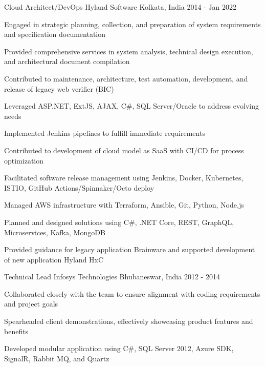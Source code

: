 \begin{cventries}
  \cventry
    {Cloud Architect/DevOps} %
    {Hyland Software} %
    {Kolkata, India} %
    {2014 - Jan 2022} %
    {
      \begin{cvitems} %
        \item {Engaged in strategic planning, collection, and preparation of system requirements and specification documentation}
        \item {Provided comprehensive services in system analysis, technical design execution, and architectural document compilation}
        \item {Contributed to maintenance, architecture, test automation, development, and release of legacy web verifier (BIC)}
        \item {Leveraged ASP.NET, ExtJS, AJAX, C\#, SQL Server/Oracle to address evolving needs}
        \item {Implemented Jenkins pipelines to fulfill immediate requirements}
        \item {Contributed to development of cloud model as SaaS with CI/CD for process optimization}
        \item {Facilitated software release management using Jenkins, Docker, Kubernetes, ISTIO, GitHub Actions/Spinnaker/Octo deploy}
        \item {Managed AWS infrastructure with Terraform, Ansible, Git, Python, Node.js}
        \item {Planned and designed solutions using C\#, .NET Core, REST, GraphQL, Microservices, Kafka, MongoDB}
        \item {Provided guidance for legacy application Brainware and supported development of new application Hyland HxC}\\
      \end{cvitems}
    }

  \cventry
    {Technical Lead} %
    {Infosys Technologies} %
    {Bhubaneswar, India} %
    {2012 - 2014} %
    {
      \begin{cvitems} %
        \item {Collaborated closely with the team to ensure alignment with coding requirements and project goals}
        \item {Spearheaded client demonstrations, effectively showcasing product features and benefits}
        \item {Developed modular application using C\#, SQL Server 2012, Azure SDK, SignalR, Rabbit MQ, and Quartz}\\
      \end{cvitems}
    }


\end{cventries}
